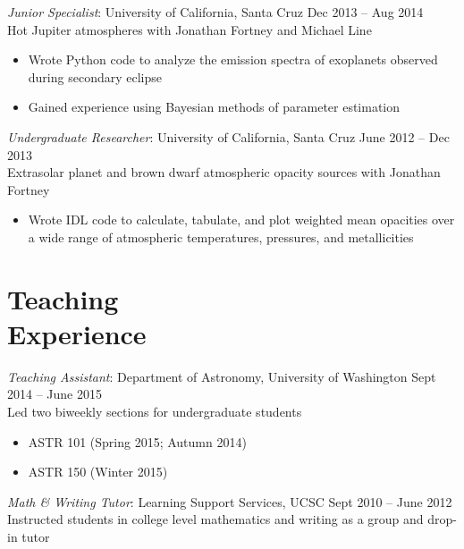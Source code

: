 \documentclass[margin,10pt]{res}
\begin{document}
\begin{resume}
                {\sl Junior Specialist}: University of California, Santa Cruz \hfill          Dec 2013 -- Aug 2014\\
                Hot Jupiter atmospheres with Jonathan Fortney and Michael Line
                    \begin{itemize}  \itemsep -1pt %
                        \item Wrote Python code to analyze the emission spectra of exoplanets observed during secondary eclipse
                        \item Gained experience using Bayesian methods of parameter estimation
                    \end{itemize}  
                    
                {\sl Undergraduate Researcher}: University of California, Santa Cruz \hfill          June 2012 -- Dec 2013\\
                Extrasolar planet and brown dwarf atmospheric opacity sources with Jonathan Fortney
                    \begin{itemize}  \itemsep -1pt %
                        \item Wrote IDL code to calculate, tabulate, and plot weighted mean opacities over a wide range of atmospheric temperatures, pressures, and metallicities\\
                    \end{itemize}
   
\section{Teaching \\Experience} 
                {\sl Teaching Assistant}: Department of Astronomy, University of Washington   \hfill          Sept 2014 -- June 2015\\
                Led two biweekly sections for undergraduate students
                    \begin{itemize}  \itemsep -1pt %
                        \item ASTR 101 (Spring 2015; Autumn 2014)
                        \item ASTR 150 (Winter 2015)
                    \end{itemize}  
                
                {\sl Math \& Writing Tutor}: Learning Support Services, UCSC   \hfill          Sept 2010 -- June 2012\\
                Instructed students in college level mathematics and writing as a group and drop-in tutor\\


\end{resume}
\end{document}
